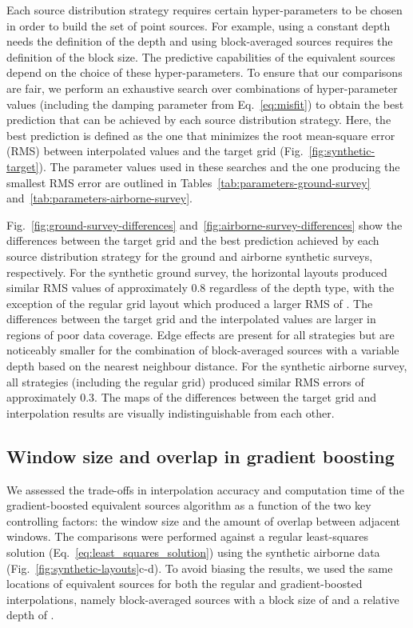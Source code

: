 Each source distribution strategy requires certain hyper-parameters to be
chosen in order to build the set of point sources.
For example, using a constant depth needs the definition of the depth and using
block-averaged sources requires the definition of the block size.
The predictive capabilities of the equivalent sources depend on the choice of
these hyper-parameters.
To ensure that our comparisons are fair, we perform an exhaustive search over
combinations of hyper-parameter values (including the damping parameter from
Eq.~\ref{eq:misfit}) to obtain the best prediction that can be achieved by each
source distribution strategy.
Here, the best prediction is defined as the one that minimizes the root
mean-square error (RMS) between interpolated values and the target grid
(Fig.~\ref{fig:synthetic-target}).
The parameter values used in these searches and the one producing the smallest
RMS error are outlined in Tables~\ref{tab:parameters-ground-survey}
and~\ref{tab:parameters-airborne-survey}.

Fig.~\ref{fig:ground-survey-differences}
and~\ref{fig:airborne-survey-differences} show the differences between the
target grid and the best prediction achieved by each source distribution
strategy for the ground and airborne synthetic surveys, respectively.
For the synthetic ground survey, the horizontal layouts produced similar RMS
values of approximately 0.8\mGal{} regardless of the depth type, with the
exception of the regular grid layout which produced a larger RMS of
\BestGroundGridSourcesConstantDepthRms{}\mGal{}.
The differences between the target grid and the interpolated values are larger
in regions of poor data coverage.
Edge effects are present for all strategies but are noticeably smaller for the
combination of block-averaged sources with a variable depth based on the
nearest neighbour distance.
For the synthetic airborne survey, all strategies (including the regular grid)
produced similar RMS errors of approximately 0.3\mGal{}.
The maps of the differences between the target grid and interpolation results
are visually indistinguishable from each other.



\subsection{Window size and overlap in gradient boosting}
\label{sec:window_size_and_overlap}

We assessed the trade-offs in interpolation accuracy and computation time of
the gradient-boosted equivalent sources algorithm as a function of the two key
controlling factors: the window size and the amount of overlap between adjacent
windows.
The comparisons were performed against a regular least-squares solution
(Eq.~\ref{eq:least_squares_solution}) using the synthetic airborne data
(Fig.~\ref{fig:synthetic-layouts}c-d).
To avoid biasing the results, we used the same locations of equivalent sources
for both the regular and gradient-boosted interpolations, namely
block-averaged sources with a block size of
\BestAirborneBlockAveragedSourcesRelativeDepthSpacing\m{} and a
relative depth of
\BestAirborneBlockAveragedSourcesRelativeDepthDepth\m{}.

